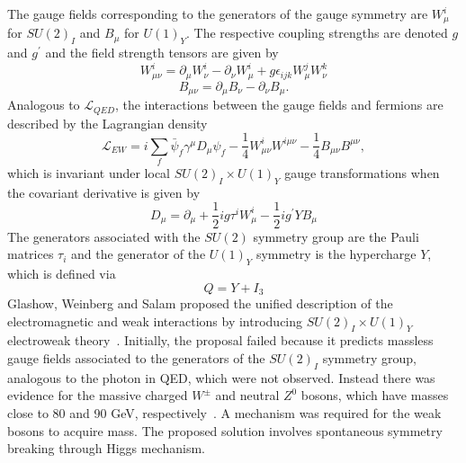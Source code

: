 The gauge fields corresponding to the generators of the gauge symmetry are $W^i_{\mu}$ for $SU(2)_I$ and $B_{\mu}$ for $U(1)_Y$.  The respective coupling strengths are denoted $g$ and $g^{\prime}$ and the field strength tensors are given by
%
\begin{equation}
W^i_{\mu\nu} = \partial_{\mu} W^i_{\nu} - \partial_{\nu} W^i_{\mu} + g \epsilon_{ijk} W^j_{\mu} W^k_{\nu} 
\end{equation}
\begin{equation}
B_{\mu\nu} = \partial_{\mu} B_{\nu} - \partial_{\nu} B_{\mu}.
\end{equation}
%
Analogous to $\mathcal{L}_{QED}$, the interactions between the gauge fields and fermions are described by the Lagrangian density 
%
\begin{equation}
\mathcal{L}_{EW} =  i\sum_f\bar{\psi}_f\gamma^{\mu} D_{\mu}\psi_f - \frac{1}{4} W^i_{\mu\nu}W^{i\mu\nu} - \frac{1}{4} B_{\mu\nu}B^{\mu\nu},
\end{equation}
%
which is invariant under local $SU(2)_I \times U(1)_Y$ gauge transformations when the covariant derivative is given by
%
\begin{equation}
D_{\mu} = \partial_{\mu} + \frac{1}{2}i g \tau^i W^i_{\mu} - \frac{1}{2}i g^{\prime} Y B_{\mu}  
\end{equation}
%
The generators associated with the $SU(2)$  symmetry group are the Pauli matrices $\tau_i$ and the generator of the $U(1)_Y$ symmetry is the hypercharge $Y$, which is defined via
%
\begin{equation}
Q = Y + I_3
\end{equation}
%
Glashow, Weinberg and Salam proposed the unified description of the electromagnetic and weak interactions by introducing $SU(2)_I \times U(1)_Y$ electroweak theory~\cite{Glashow1961579,Salam1964168,PhysRevLett.19.1264}.  Initially, the proposal failed because it predicts massless gauge fields associated to the generators of the $SU(2)_I$ symmetry group, analogous to the photon in QED, which were not observed. Instead there was evidence for the massive charged $W^{\pm}$ and neutral $Z^0$ bosons, which have masses close to 80 and 90 GeV, respectively~\cite{Banner1983476,Arnison1983398}. A mechanism was required for the weak bosons to acquire mass. The proposed solution involves spontaneous symmetry breaking through Higgs mechanism.

